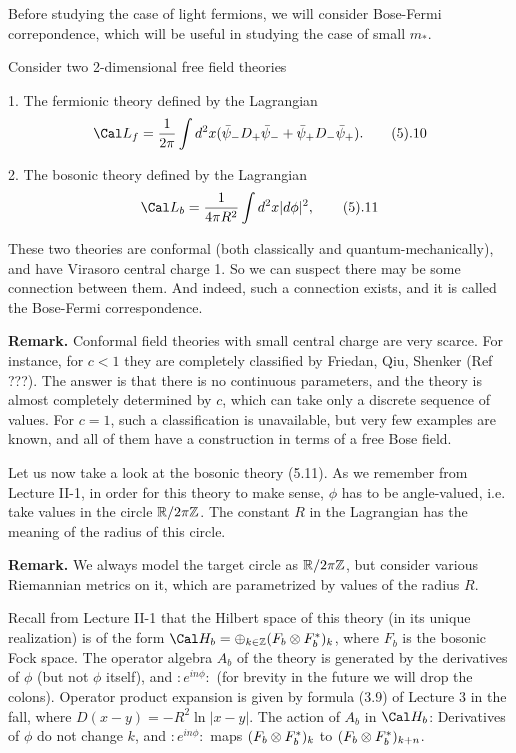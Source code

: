 Before studying the case of light fermions, we will consider Bose-Fermi 
correpondence, which will be useful in studying the case of small $m_*$. 

Consider two 2-dimensional free field theories

1. The fermionic theory defined by the Lagrangian
$$
\Cal L_f=\frac{1}{2\pi}
\int d^2x(\bar\psi_-D_+\bar \psi_-+\bar\psi_+D_-\bar\psi_+).
\tag 5.10
$$

2. The bosonic theory defined by the Lagrangian 
$$
\Cal L_b=\frac{1}{4\pi R^2}\int d^2x |d\phi|^2,\tag 5.11
$$

These two theories are conformal (both classically and quantum-mechanically),
and have Virasoro central charge 1. So we can suspect there may be some 
connection between them. And indeed, such a connection exists, and 
it is called the Bose-Fermi correspondence. 

{\bf Remark.} Conformal field theories with small central charge are very 
scarce. For instance, for $c<1$ they are completely classified
by Friedan, Qiu, Shenker (Ref ???). The answer is that there is no continuous 
parameters, and the theory is almost completely determined by $c$,
which can take only a discrete sequence of values. For $c=1$, such a 
classification is unavailable, but very few examples are known, and 
all of them have a construction in terms of a free Bose field. 

Let us now take a look at the bosonic theory (5.11). 
As we remember from Lecture II-1, in order for this theory to make sense, 
$\phi$ has to be angle-valued, i.e. take values in the circle
$\Bbb R/2\pi \Bbb Z$. The constant $R$ in the Lagrangian has the meaning 
of the radius of this circle.
 
{\bf Remark.} We always model the target circle as $\Bbb R/2\pi \Bbb Z$, 
but consider various Riemannian metrics on it, which are parametrized 
by values of the radius $R$.
 
Recall from Lecture II-1 that the Hilbert space 
of this theory (in its unique realization)
is of the form $\Cal H_b=\oplus_{k\in \Bbb Z}
(F_b\o F_b^*)_k$, where $F_b$ is the bosonic Fock space. The operator algebra 
$A_b$ of the theory is generated by the 
derivatives of $\phi$ (but not $\phi$ itself), 
and $:e^{in\phi}:$ (for brevity in the future we will drop 
the colons). Operator product expansion is given by 
formula (3.9) of Lecture 3 in the fall, where $D(x-y)=-R^2\ln|x-y|$.
The action of $A_b$ in $\Cal H_b$:
Derivatives of $\phi$ do not change $k$, and 
$:e^{in\phi}:$ maps $(F_b\otimes F_b^*)_k$ to $(F_b\otimes F_b^*)_{k+n}$. 
  
